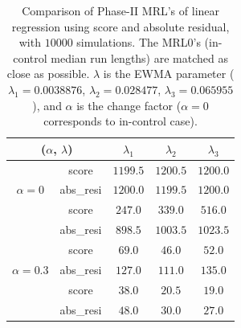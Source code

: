 \documentclass[twoside,11pt]{article}
\begin{document}
\begin{table}[!t]
\centering
\begin{tabular}{ccccc}
\toprule
\multicolumn{2}{c}{($ \alpha$, $ \lambda$)} & {$ \lambda_1$} & {$ \lambda_2$} & {$ \lambda_3$} \\
\midrule
\multirow{3}{*}{$ \alpha=0$} & score &$1199.5$ & $1200.5$ & $1200.0$ \\
& abs\_resi &$1200.0$ & $1199.5$ & $1200.0$ \\
\midrule
\multirow{3}{*}{$\alpha=0.1$} & score &$\bm{247.0}$ & $\bm{339.0}$ & $\bm{516.0}$ \\
& abs\_resi &$898.5$ & $1003.5$ & $1023.5$ \\
\midrule
\multirow{3}{*}{$\alpha=0.3$} & score &$\bm{69.0}$ & $\bm{46.0}$ & $\bm{52.0}$ \\
& abs\_resi &$127.0$ & $111.0$ & $135.0$ \\
\midrule
\multirow{3}{*}{$\alpha=0.5$} & score &$\bm{38.0}$ & $\bm{20.5}$ & $\bm{19.0}$ \\
& abs\_resi &$48.0$ & $30.0$ & $27.0$ \\
\midrule
\end{tabular}
\caption{Comparison of Phase-II MRL's of linear regression using score and absolute residual, with $10000$ simulations. The MRL0's (in-control median run lengths) are matched as close as possible. $ \lambda$ is the EWMA parameter ( {$ \lambda_1 = 0.0038876$}, {$ \lambda_2 = 0.028477$}, {$ \lambda_3 =0.065955$}), and $ \alpha$ is the change factor ($ \alpha=0$ corresponds to in-control case).}
\label{tab:lin_MRL}
\end{table}
\end{document}
